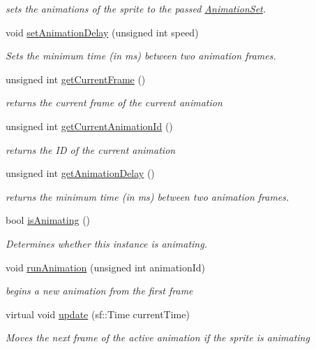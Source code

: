 \begin{DoxyCompactItemize}
\begin{DoxyCompactList}\small\item\em sets the animations of the sprite to the passed \hyperlink{class_animation_set}{Animation\+Set}. \end{DoxyCompactList}\item 
void \hyperlink{class_animated_sprite_a4dd9673ba304de36d69f15fe367a6e82}{set\+Animation\+Delay} (unsigned int speed)
\begin{DoxyCompactList}\small\item\em Sets the minimum time (in ms) between two animation frames. \end{DoxyCompactList}\item 
unsigned int \hyperlink{class_animated_sprite_a4d7dc2868007f5b15d3b25f7ab918155}{get\+Current\+Frame} ()
\begin{DoxyCompactList}\small\item\em returns the current frame of the current animation\end{DoxyCompactList}\item 
unsigned int \hyperlink{class_animated_sprite_abd64b160fdfae1d1eec67e017af5f375}{get\+Current\+Animation\+Id} ()
\begin{DoxyCompactList}\small\item\em returns the ID of the current animation \end{DoxyCompactList}\item 
unsigned int \hyperlink{class_animated_sprite_a23593d75ebc15e0e9969480239ae7830}{get\+Animation\+Delay} ()
\begin{DoxyCompactList}\small\item\em returns the minimum time (in ms) between two animation frames. \end{DoxyCompactList}\item 
bool \hyperlink{class_animated_sprite_a40beb8105603bf726270fb38400fe6bf}{is\+Animating} ()
\begin{DoxyCompactList}\small\item\em Determines whether this instance is animating. \end{DoxyCompactList}\item 
void \hyperlink{class_animated_sprite_a38725e0f5facf5d3d993500476790a9f}{run\+Animation} (unsigned int animation\+Id)
\begin{DoxyCompactList}\small\item\em begins a new animation from the first frame \end{DoxyCompactList}\item 
virtual void \hyperlink{class_animated_sprite_afdeda3e3030963a8ba290e23e48acc40}{update} (sf\+::\+Time current\+Time)
\begin{DoxyCompactList}\small\item\em Moves the next frame of the active animation if the sprite is animating \end{DoxyCompactList}\end{DoxyCompactItemize}
